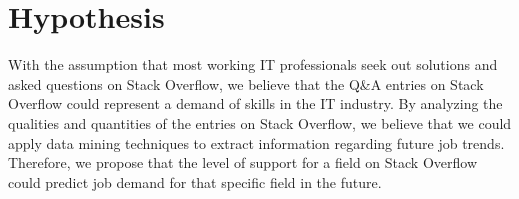 \section{Hypothesis}
With the assumption that most working IT professionals seek out solutions and asked questions on Stack Overflow, we believe that the Q\&A entries on Stack Overflow could represent a demand of skills in the IT industry. By analyzing the qualities and quantities of the entries on Stack Overflow, we believe that we could apply data mining techniques to extract information regarding future job trends. Therefore, we propose that the level of support for a field on Stack Overflow could predict job demand for that specific field in the future.
